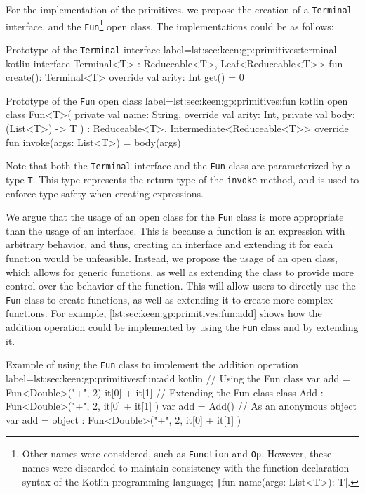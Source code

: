     For the implementation of the primitives, we propose the creation of a
    \texttt{Terminal} interface, and the \texttt{Fun}\footnote{
      Other names were considered, such as \texttt{Function} and \texttt{Op}.
      However, these names were discarded to maintain consistency with the
      function declaration syntax of the Kotlin programming language; 
      \texttt|fun name(args: List<T>): T|.
    } open class.
    The implementations could be as follows:

    \begin{code}{Prototype of the \texttt{Terminal} interface}{
      label=lst:sec:keen:gp:primitives:terminal
    }{kotlin}
      interface Terminal<T> : Reduceable<T>, Leaf<Reduceable<T>> {
          fun create(): Terminal<T>
          override val arity: Int
              get() = 0
      }
    \end{code}

    \begin{code}{Prototype of the \texttt{Fun} open class}{
      label=lst:sec:keen:gp:primitives:fun
    }{kotlin}
      open class Fun<T>(
          private val name: String,
          override val arity: Int,
          private val body: (List<T>) -> T
      ) : Reduceable<T>, Intermediate<Reduceable<T>> {
          override fun invoke(args: List<T>) = body(args)
      }
    \end{code}

    Note that both the \texttt{Terminal} interface and the \texttt{Fun} class
    are parameterized by a type \texttt{T}. This type represents the return
    type of the \texttt{invoke} method, and is used to enforce type safety
    when creating expressions.

    We argue that the usage of an open class for the \texttt{Fun} class is
    more appropriate than the usage of an interface. This is because a function
    is an expression with arbitrary behavior, and thus, creating an interface
    and extending it for each function would be unfeasible. Instead, we propose
    the usage of an open class, which allows for generic functions, as well as
    extending the class to provide more control over the behavior of the
    function.
    This will allow users to directly use the \texttt{Fun} class to create
    functions, as well as extending it to create more complex functions.
    For example, \vref{lst:sec:keen:gp:primitives:fun:add} shows how the
    addition operation could be implemented by using the \texttt{Fun} class and
    by extending it.
    \begin{code}{
      Example of using the \texttt{Fun} class to implement the addition 
      operation
    }{
      label=lst:sec:keen:gp:primitives:fun:add
    }{kotlin}
      // Using the Fun class
      var add = Fun<Double>("+", 2) { it[0] + it[1] }
      // Extending the Fun class
      class Add : Fun<Double>("+", 2, { it[0] + it[1] })
      var add = Add()
      // As an anonymous object
      var add = object : Fun<Double>("+", 2, { it[0] + it[1] }) {}
    \end{code}